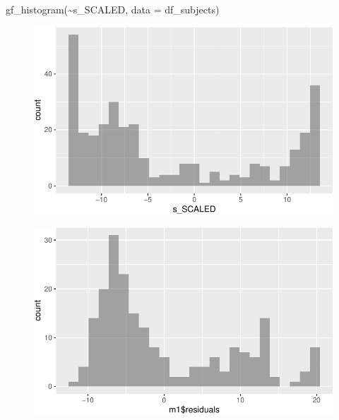 \documentclass[
  letterpaper,
  DIV=11,
  numbers=noendperiod]{scrreprt}
\newenvironment{Shaded}{\begin{snugshade}}{\end{snugshade}}
\newcommand{\AttributeTok}[1]{\textcolor[rgb]{0.40,0.45,0.13}{#1}}
\newcommand{\FunctionTok}[1]{\textcolor[rgb]{0.28,0.35,0.67}{#1}}
\newcommand{\NormalTok}[1]{\textcolor[rgb]{0.00,0.23,0.31}{#1}}
\newcommand{\SpecialCharTok}[1]{\textcolor[rgb]{0.37,0.37,0.37}{#1}}
\begin{document}
\begin{Shaded}
\begin{Highlighting}[]
\FunctionTok{gf\_histogram}\NormalTok{(}\SpecialCharTok{\textasciitilde{}}\NormalTok{s\_SCALED, }\AttributeTok{data =}\NormalTok{ df\_subjects)}
\end{Highlighting}
\end{Shaded}

\begin{figure}[H]

{\centering \includegraphics{analysis/SGC3A/5_sgc3A_exploration_files/figure-pdf/unnamed-chunk-10-5.pdf}

}

\end{figure}

\begin{Shaded}
\end{Shaded}

\begin{figure}[H]

{\centering \includegraphics{analysis/SGC3A/5_sgc3A_exploration_files/figure-pdf/unnamed-chunk-10-6.pdf}

}

\end{figure}
\end{document}
